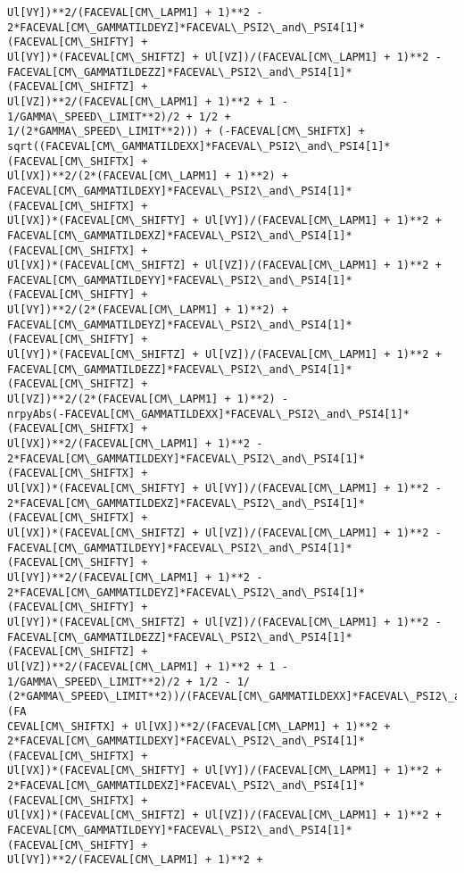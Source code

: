\documentclass[landscape,letterpaper,10pt,english]{article}
\begin{document}
\begin{Verbatim}[commandchars=\\\{\}]
Ul[VY])**2/(FACEVAL[CM\_LAPM1] + 1)**2 -
2*FACEVAL[CM\_GAMMATILDEYZ]*FACEVAL\_PSI2\_and\_PSI4[1]*(FACEVAL[CM\_SHIFTY] +
Ul[VY])*(FACEVAL[CM\_SHIFTZ] + Ul[VZ])/(FACEVAL[CM\_LAPM1] + 1)**2 -
FACEVAL[CM\_GAMMATILDEZZ]*FACEVAL\_PSI2\_and\_PSI4[1]*(FACEVAL[CM\_SHIFTZ] +
Ul[VZ])**2/(FACEVAL[CM\_LAPM1] + 1)**2 + 1 - 1/GAMMA\_SPEED\_LIMIT**2)/2 + 1/2 +
1/(2*GAMMA\_SPEED\_LIMIT**2))) + (-FACEVAL[CM\_SHIFTX] +
sqrt((FACEVAL[CM\_GAMMATILDEXX]*FACEVAL\_PSI2\_and\_PSI4[1]*(FACEVAL[CM\_SHIFTX] +
Ul[VX])**2/(2*(FACEVAL[CM\_LAPM1] + 1)**2) +
FACEVAL[CM\_GAMMATILDEXY]*FACEVAL\_PSI2\_and\_PSI4[1]*(FACEVAL[CM\_SHIFTX] +
Ul[VX])*(FACEVAL[CM\_SHIFTY] + Ul[VY])/(FACEVAL[CM\_LAPM1] + 1)**2 +
FACEVAL[CM\_GAMMATILDEXZ]*FACEVAL\_PSI2\_and\_PSI4[1]*(FACEVAL[CM\_SHIFTX] +
Ul[VX])*(FACEVAL[CM\_SHIFTZ] + Ul[VZ])/(FACEVAL[CM\_LAPM1] + 1)**2 +
FACEVAL[CM\_GAMMATILDEYY]*FACEVAL\_PSI2\_and\_PSI4[1]*(FACEVAL[CM\_SHIFTY] +
Ul[VY])**2/(2*(FACEVAL[CM\_LAPM1] + 1)**2) +
FACEVAL[CM\_GAMMATILDEYZ]*FACEVAL\_PSI2\_and\_PSI4[1]*(FACEVAL[CM\_SHIFTY] +
Ul[VY])*(FACEVAL[CM\_SHIFTZ] + Ul[VZ])/(FACEVAL[CM\_LAPM1] + 1)**2 +
FACEVAL[CM\_GAMMATILDEZZ]*FACEVAL\_PSI2\_and\_PSI4[1]*(FACEVAL[CM\_SHIFTZ] +
Ul[VZ])**2/(2*(FACEVAL[CM\_LAPM1] + 1)**2) -
nrpyAbs(-FACEVAL[CM\_GAMMATILDEXX]*FACEVAL\_PSI2\_and\_PSI4[1]*(FACEVAL[CM\_SHIFTX] +
Ul[VX])**2/(FACEVAL[CM\_LAPM1] + 1)**2 -
2*FACEVAL[CM\_GAMMATILDEXY]*FACEVAL\_PSI2\_and\_PSI4[1]*(FACEVAL[CM\_SHIFTX] +
Ul[VX])*(FACEVAL[CM\_SHIFTY] + Ul[VY])/(FACEVAL[CM\_LAPM1] + 1)**2 -
2*FACEVAL[CM\_GAMMATILDEXZ]*FACEVAL\_PSI2\_and\_PSI4[1]*(FACEVAL[CM\_SHIFTX] +
Ul[VX])*(FACEVAL[CM\_SHIFTZ] + Ul[VZ])/(FACEVAL[CM\_LAPM1] + 1)**2 -
FACEVAL[CM\_GAMMATILDEYY]*FACEVAL\_PSI2\_and\_PSI4[1]*(FACEVAL[CM\_SHIFTY] +
Ul[VY])**2/(FACEVAL[CM\_LAPM1] + 1)**2 -
2*FACEVAL[CM\_GAMMATILDEYZ]*FACEVAL\_PSI2\_and\_PSI4[1]*(FACEVAL[CM\_SHIFTY] +
Ul[VY])*(FACEVAL[CM\_SHIFTZ] + Ul[VZ])/(FACEVAL[CM\_LAPM1] + 1)**2 -
FACEVAL[CM\_GAMMATILDEZZ]*FACEVAL\_PSI2\_and\_PSI4[1]*(FACEVAL[CM\_SHIFTZ] +
Ul[VZ])**2/(FACEVAL[CM\_LAPM1] + 1)**2 + 1 - 1/GAMMA\_SPEED\_LIMIT**2)/2 + 1/2 - 1/
(2*GAMMA\_SPEED\_LIMIT**2))/(FACEVAL[CM\_GAMMATILDEXX]*FACEVAL\_PSI2\_and\_PSI4[1]*(FA
CEVAL[CM\_SHIFTX] + Ul[VX])**2/(FACEVAL[CM\_LAPM1] + 1)**2 +
2*FACEVAL[CM\_GAMMATILDEXY]*FACEVAL\_PSI2\_and\_PSI4[1]*(FACEVAL[CM\_SHIFTX] +
Ul[VX])*(FACEVAL[CM\_SHIFTY] + Ul[VY])/(FACEVAL[CM\_LAPM1] + 1)**2 +
2*FACEVAL[CM\_GAMMATILDEXZ]*FACEVAL\_PSI2\_and\_PSI4[1]*(FACEVAL[CM\_SHIFTX] +
Ul[VX])*(FACEVAL[CM\_SHIFTZ] + Ul[VZ])/(FACEVAL[CM\_LAPM1] + 1)**2 +
FACEVAL[CM\_GAMMATILDEYY]*FACEVAL\_PSI2\_and\_PSI4[1]*(FACEVAL[CM\_SHIFTY] +
Ul[VY])**2/(FACEVAL[CM\_LAPM1] + 1)**2 +

\end{Verbatim}
\end{document}
